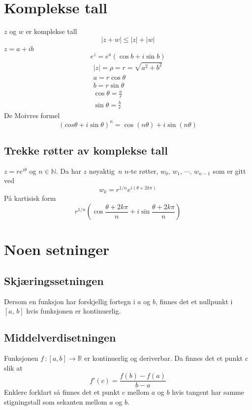 \documentclass[defaultpackages]{cheatsheet}
\begin{document}
	\section{Komplekse tall}

	$z$ og $w$ er komplekse tall
	\[|z+w|\le |z|+|w|\]
	$z=a+ib$
	\[e^z = e^a(\cos b + i\sin b)\]
	\begin{gather*}
		|z| = \rho = r = \sqrt{a^2+b^2}\\
		a = r\cos\theta\\
		b = r\sin\theta\\
		\cos \theta = \frac{a}{r}\\
		\sin \theta = \frac{b}{r}
	\end{gather*}
	De Moivres formel
	\[(cos \theta + i\sin\theta)^n = \cos(n\theta) + i\sin(n\theta)\]
	\subsection{Trekke røtter av komplekse tall}
	$z=re^{i\theta}$ og $n \in \mathbb{N}$. Da har $z$ nøyaktig $n$ $n$-te røtter, $w_0,\,w_1,\,\cdots,\,w_{n-1}$ som er gitt ved
	\[w_k = r^{1/n}e^{i(\theta + 2k\pi)}\]
	På kartisisk form
	\[r^{1/n} \left(\cos \frac{\theta + 2k\pi}{n} + i \sin \frac{\theta + 2k\pi}{n}\right)\]

	\section{Noen setninger}
	\subsection{Skjæringssetningen}
	Dersom en funksjon har forskjellig fortegn i $a$ og $b$, finnes det et nullpunkt i $[a,\,b]$ hvis funksjonen er kontinuerlig.
	\subsection{Middelverdisetningen}
	Funksjonen $f \,\colon [a, b] \to \mathbb{R}$ er kontinuerlig og deriverbar. Da finnes det et punkt $c$ slik at
	\[f'(c) = \frac{f(b) - f(a)}{b-a}\]
	Enklere forklart så finnes det et punkt $c$ mellom $a$ og $b$ hvis tangent har samme stigningstall som sekanten mellom $a$ og $b$. 
\end{document}
